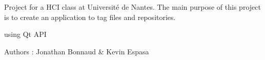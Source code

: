 Project for a H\-C\-I class at Université de Nantes. The main purpose of this project is to create an application to tag files and repositories.
\begin{DoxyItemize}
\item using Qt A\-P\-I
\end{DoxyItemize}

Authors \-: Jonathan Bonnaud \& Kevin Espasa 